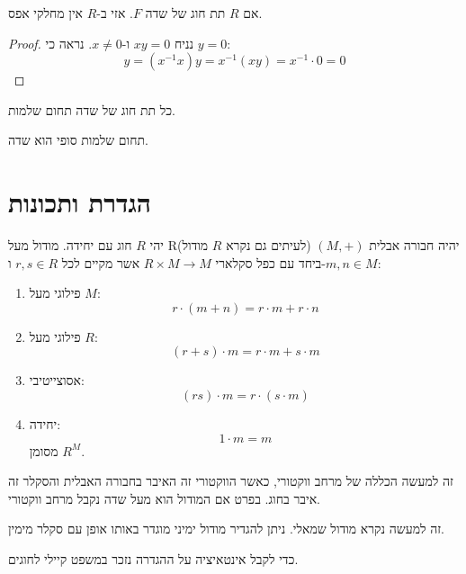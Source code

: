\documentclass{tstextbook}
\begin{document}
\begin{proposition}
אם \(R\) תת חוג של שדה \(F\). אזי ב-\(R\) אין מחלקי אפס.

\end{proposition}
\begin{proof}
נניח \(xy=0\) ו-\(x\neq 0\). נראה כי \(y=0\):
$$y=\left(x^{-1}x\right)y=x^{-1}\left(x y\right)=x^{-1}\cdot0=0$$

\end{proof}
\begin{corollary}
כל תת חוג של שדה תחום שלמות.

\end{corollary}
\begin{proposition}
תחום שלמות סופי הוא שדה.

\end{proposition}

\section{הגדרת ותכונות}

\begin{definition}[מודול]
יהי \(R\) חוג עם יחידה. מודול מעל R(לעיתים גם נקרא \(R\) מודול) יהיה חבורה אבלית \((M,+)\) ביחד עם כפל סקלארי \(R\times M\to M\) אשר מקיים לכל \(r,s \in R\) ו-\(m,n \in M\):

  \begin{enumerate}
    \item פילוגי מעל \(M\): 
$$r\cdot\left(m+n\right)=r\cdot m+r\cdot n$$


    \item פילוגי מעל \(R\): 
$$(r+s)\cdot m=r\cdot m+s\cdot m$$


    \item אסוצייטיבי: 
$$(rs)\cdot m=r\cdot(s\cdot m)$$


    \item יחידה: 
$$1\cdot m= m$$
מסומן \(R^{M}\).


  \end{enumerate}
\end{definition}
\begin{remark}
זה למעשה הכללה של מרחב ווקטורי, כאשר הווקטורי זה האיבר בחבורה האבלית והסקלר זה איבר בחוג. בפרט אם המודול הוא מעל שדה נקבל מרחב ווקטורי.

\end{remark}
\begin{remark}
זה למעשה נקרא מודול שמאלי. ניתן להגדיר מודול ימיני מוגדר באותו אופן עם סקלר מימין.

\end{remark}
כדי לקבל אינטאיציה על ההגדרה נזכר במשפט קיילי לחוגים.
\end{document}
